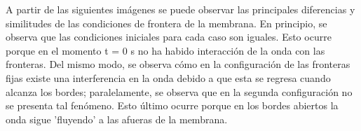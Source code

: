 \documentclass[11pt,letterpaper]{exam}
\begin{document}
A partir de las siguientes im\'agenes se puede observar las principales diferencias y similitudes de las condiciones de frontera de la membrana. En principio, se observa que las condiciones iniciales para cada caso son iguales. Esto ocurre porque en el momento t = 0 s no ha habido interacci\'on de la onda con las fronteras. Del mismo modo, se observa c\'omo en la configuraci\'on de las fronteras fijas existe una interferencia en la onda debido a que esta se regresa cuando alcanza los bordes; paralelamente, se observa que en la segunda configuraci\'on no se presenta tal fen\'omeno. Esto \'ultimo ocurre porque en los bordes abiertos la onda sigue 'fluyendo' a las afueras de la membrana.
\end{document}
